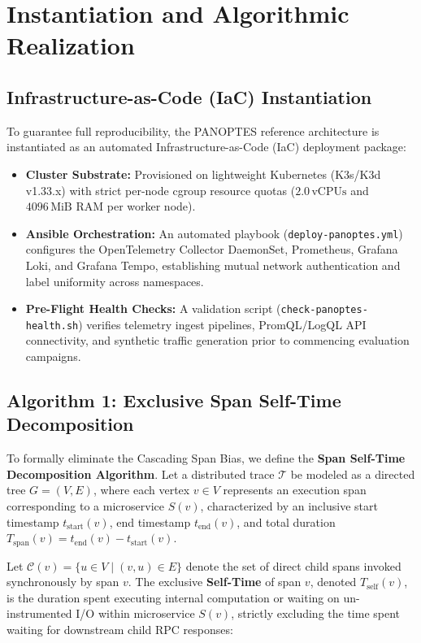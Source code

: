\section{Instantiation and Algorithmic Realization}
\label{sec:algorithms}

\subsection{Infrastructure-as-Code (IaC) Instantiation}
To guarantee full reproducibility, the PANOPTES reference architecture is instantiated as an automated Infrastructure-as-Code (IaC) deployment package:
\begin{itemize}[leftmargin=1.2em, itemsep=2pt, topsep=3pt]
    \item \textbf{Cluster Substrate:} Provisioned on lightweight Kubernetes (K3s/K3d v1.33.x) with strict per-node cgroup resource quotas ($2.0\,\text{vCPUs}$ and $4096\,\text{MiB}$ RAM per worker node).
    \item \textbf{Ansible Orchestration:} An automated playbook (\texttt{deploy-panoptes.yml}) configures the OpenTelemetry Collector DaemonSet, Prometheus, Grafana Loki, and Grafana Tempo, establishing mutual network authentication and label uniformity across namespaces.
    \item \textbf{Pre-Flight Health Checks:} A validation script (\texttt{check-panoptes-health.sh}) verifies telemetry ingest pipelines, PromQL/LogQL API connectivity, and synthetic traffic generation prior to commencing evaluation campaigns.
\end{itemize}

\subsection{Algorithm 1: Exclusive Span Self-Time Decomposition}
To formally eliminate the Cascading Span Bias, we define the \textbf{Span Self-Time Decomposition Algorithm}. Let a distributed trace $\mathcal{T}$ be modeled as a directed tree $G = (V, E)$, where each vertex $v \in V$ represents an execution span corresponding to a microservice $S(v)$, characterized by an inclusive start timestamp $t_{\text{start}}(v)$, end timestamp $t_{\text{end}}(v)$, and total duration $T_{\text{span}}(v) = t_{\text{end}}(v) - t_{\text{start}}(v)$.

Let $\mathcal{C}(v) = \{u \in V \mid (v, u) \in E\}$ denote the set of direct child spans invoked synchronously by span $v$. The exclusive \textbf{Self-Time} of span $v$, denoted $T_{\text{self}}(v)$, is the duration spent executing internal computation or waiting on un-instrumented I/O within microservice $S(v)$, strictly excluding the time spent waiting for downstream child RPC responses:

